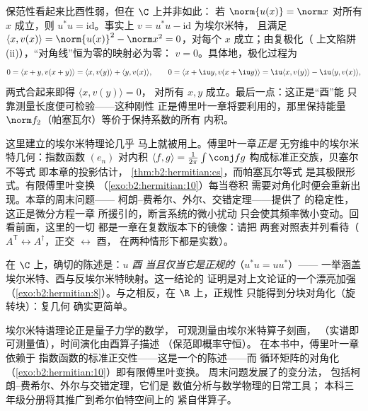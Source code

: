 \begin{example}[等距变换恰好就是酉变换]\label{ex:b2:hermitian:isometry}
保范性看起来比酉性弱，但在 $\C$ 上并非如此：
若 $\norm{u(x)} = \norm x$ 对所有 $x$ 成立，则 $u^*u =
\mathrm{id}$。事实上 $v = u^*u - \mathrm{id}$ 为埃尔米特，
且满足 $\langle x, v(x)\rangle = \norm{u(x)}^2 - \norm x^2 =
0$，对每个 $x$ 成立；由复极化（
上文陷阱 (ii)），“对角线”恒为零的映射必为零：
$v = 0$。具体地，极化过程为
\[
0 = \langle x + y, v(x+y)\rangle
= \langle x, v(y)\rangle + \langle y, v(x)\rangle,
\qquad
0 = \langle x + \iu y, v(x + \iu y)\rangle
= \iu\langle x, v(y)\rangle - \iu\langle y, v(x)\rangle ,
\]
两式合起来即得 $\langle x, v(y)\rangle = 0$，
对所有 $x, y$ 成立。最后一点：这正是“酉”能
只靠测量长度便可检验——这种刚性
正是傅里叶一章将要利用的，那里保持能量
$\norm f_2$（帕塞瓦尔）等价于保持系数的所有
内积。
\end{example}

\begin{remark}[本卷中的几种视角]
这里建立的埃尔米特理论几乎
马上就被用上。傅里叶一章\emph{正是}
无穷维中的埃尔米特几何：指数函数 $(e_n)$
对内积 $\langle f, g\rangle =
\frac{1}{2\pi}\int\conj fg$ 构成标准正交族，贝塞尔不等式
即本章的投影估计，
\cref{thm:b2:hermitian:cs}，而帕塞瓦尔等式
是其极限形式。有限傅里叶变换
（\cref{exo:b2:hermitian:10}）每当卷积
需要对角化时便会重新出现。本章的周末问题——
柯朗–费希尔、外尔、交错定理——提供了
的稳定性，这正是微分方程一章
所援引的，断言系统的微小扰动
只会使其频率微小变动。回看前面，这里的一切
都是一章在复数版本下的镜像：请把
两套对照表并列看待（$A^{\mathsf T} \leftrightarrow
A^\dagger$，正交 $\leftrightarrow$ 酉，
在两种情形下都是实数）。
\end{remark}

\begin{remark}[正规自同态]
在 $\C$ 上，确切的陈述是：$u$ \emph{酉
当且仅当它是正规的}（$u^*u = uu^*$）——
一举涵盖埃尔米特、酉与反埃尔米特映射。这一结论的
证明是对上文论证的一个漂亮加强
（\cref{exo:b2:hermitian:8}）。与之相反，在 $\R$ 上，正规性
只能得到分块对角化（旋转块）：复几何
确实更简单。
\end{remark}

\begin{remark}[应用背景]
埃尔米特谱理论正是量子力学的数学，
可观测量由埃尔米特算子刻画，
（实谱即可测量值），时间演化由酉算子描述
（保范即概率守恒）。
在本书中，傅里叶一章依赖于
指数函数的标准正交性——这是一个的陈述——而
循环矩阵的对角化
（\cref{exo:b2:hermitian:10}）即有限傅里叶变换。
周末问题发展了的变分法，
包括柯朗–费希尔、外尔与交错定理，它们是
数值分析与数学物理的日常工具；
本科三年级分册将其推广到希尔伯特空间上的
紧自伴算子。
\end{remark}

